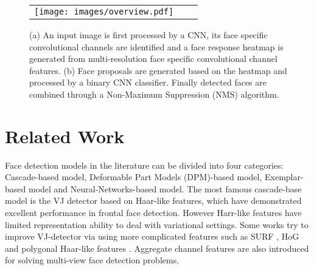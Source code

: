 \documentclass[10pt,twocolumn,letterpaper]{article}
\begin{document}

\begin{figure*}
\begin{tabular}{ccc}
\rule{0pt}{1ex}\hspace{2.24mm}\texttt{[image: images/overview.pdf]}\\[-0.1pt]
\end{tabular}
\caption{(a) An input image is first processed by a CNN, its face specific convolutional channels are identified and a face response heatmap is generated from multi-resolution face specific convolutional channel features. (b) Face proposals are generated based on the heatmap and processed by a binary CNN classifier. Finally detected faces are combined through a Non-Maximum Suppression (NMS) algorithm.}
\label{fig:overview}
\end{figure*}

\section{Related Work}
Face detection models in the literature can be divided into four categories: Cascade-based model, Deformable Part Models (DPM)-based model, Exemplar-based model and Neural-Networks-based model. The most famous cascade-base model is the VJ detector \cite{viola2001rapid} based on Haar-like features, which have demonstrated excellent performance in frontal face detection. However Harr-like features have limited representation ability to deal with variational settings. Some works try to improve VJ-detector via using more complicated features such as SURF \cite{zhu2006fast}, HoG \cite{li2013learning} and polygonal Haar-like features \cite{pham2010fast}. Aggregate channel features \cite{yang2014aggregate} are also introduced for solving multi-view face detection problems.
\end{document}
